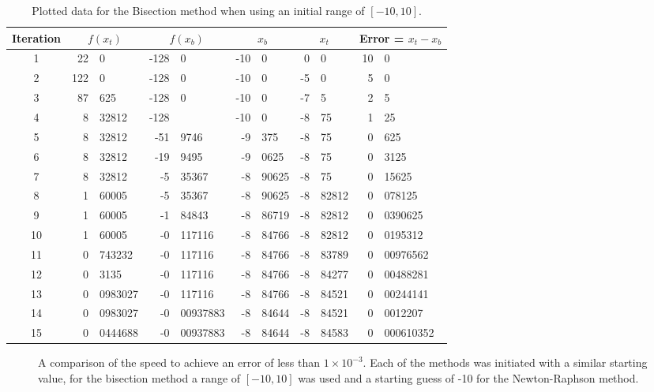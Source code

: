 \documentclass[11pt]{article} %
\newcommand{\inputTikZ}[1]{%
  }
\newcommand{\inputTikZ}[1]{%
    \beginpgfgraphicnamed{#1-external}%
    \endpgfgraphicnamed%
  }
\begin{document}
	\begin{table}[ht]
		\centering
		\begin{tabular}{c|r@{.}l|r@{.}l|r@{.}l|r@{.}l|r@{.}l}
			Iteration &\multicolumn{2}{c}{$f(x_t)$} &\multicolumn{2}{|c}{$f(x_b)$} &\multicolumn{2}{|c}{$x_b$} &\multicolumn{2}{|c}{$x_t$}&\multicolumn{2}{|c}{Error = $x_t-x_b$} \\ \hline \hline
			1	&22&0	&-128&0	&-10&0	&0&0	&10&0\\
			2	&122&0	&-128&0	&-10&0	&-5&0	&5&0\\
			3	&87&625	&-128&0	&-10&0	&-7&5	&2&5\\
			4	&8&32812	&-128&	&-10&0	&-8&75	&1&25\\
			5	&8&32812	&-51&9746	&-9&375	&-8&75	&0&625\\
			6	&8&32812	&-19&9495	&-9&0625	&-8&75	&0&3125\\
			7	&8&32812	&-5&35367	&-8&90625	&-8&75	&0&15625\\
			8	&1&60005	&-5&35367	&-8&90625	&-8&82812	&0&078125\\
			9	&1&60005	&-1&84843	&-8&86719	&-8&82812	&0&0390625\\
			10	&1&60005	&-0&117116	&-8&84766	&-8&82812	&0&0195312\\
			11	&0&743232	&-0&117116	&-8&84766	&-8&83789	&0&00976562\\
			12	&0&3135	&-0&117116	&-8&84766	&-8&84277	&0&00488281\\
			13	&0&0983027	&-0&117116	&-8&84766	&-8&84521	&0&00244141\\
			14	&0&0983027	&-0&00937883	&-8&84644	&-8&84521	&0&0012207\\
			15	&0&0444688	&-0&00937883	&-8&84644	&-8&84583	&0&000610352\\
		\end{tabular}
		\caption{Plotted data for the Bisection method when using an initial range of $[-10,10]$.}
		\label{tab:fs}
	\end{table}

	\begin{figure}[ht]
		\centering
			\inputTikZ{Graph3}
		\caption{\label{fig:compare}A comparison of the speed to achieve an error of less than $1\times10^{-3}$. Each of the methods was initiated with a similar starting value, for the bisection method a range of $[-10,10]$ was used and a starting guess of -10 for the Newton-Raphson method.}
	\end{figure}
\end{document}

